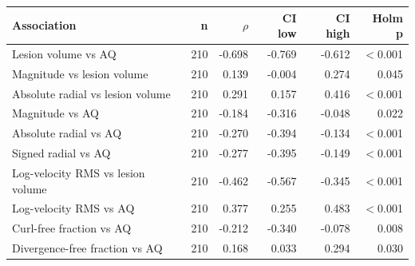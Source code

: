 \begin{tabular}{lrrrrr}
\toprule
Association & n & $\rho$ & CI low & CI high & Holm p \\
\midrule
Lesion volume vs AQ & 210 & -0.698 & -0.769 & -0.612 & $<$0.001 \\
Magnitude vs lesion volume & 210 & 0.139 & -0.004 & 0.274 & 0.045 \\
Absolute radial vs lesion volume & 210 & 0.291 & 0.157 & 0.416 & $<$0.001 \\
Magnitude vs AQ & 210 & -0.184 & -0.316 & -0.048 & 0.022 \\
Absolute radial vs AQ & 210 & -0.270 & -0.394 & -0.134 & $<$0.001 \\
Signed radial vs AQ & 210 & -0.277 & -0.395 & -0.149 & $<$0.001 \\
Log-velocity RMS vs lesion volume & 210 & -0.462 & -0.567 & -0.345 & $<$0.001 \\
Log-velocity RMS vs AQ & 210 & 0.377 & 0.255 & 0.483 & $<$0.001 \\
Curl-free fraction vs AQ & 210 & -0.212 & -0.340 & -0.078 & 0.008 \\
Divergence-free fraction vs AQ & 210 & 0.168 & 0.033 & 0.294 & 0.030 \\
\bottomrule
\end{tabular}
